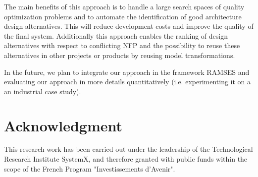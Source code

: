 \documentclass[conference]{IEEEtran}
\begin{document}
The main benefits of this approach is to handle a large search spaces of quality optimization problems and to automate the identification of good architecture design alternatives. This will reduce development costs and improve the quality of the final system. Additionally this approach enables the ranking of design alternatives with respect to conflicting NFP and the possibility to reuse these alternatives in other projects or products by reusing model transformations.

In the future, we plan to integrate our approach in the framework RAMSES and evaluating our approach in more details quantitatively (i.e. experimenting it on a an industrial case study)\cite{greg}.



\section{Acknowledgment}
This research work has been carried out under the leadership of the Technological Research Institute SystemX, and therefore granted with public funds within the scope of the French Program "Investissements d’Avenir".
\end{document}
